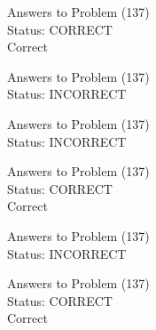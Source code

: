 \documentclass[11pt]{article}
\begin{document}
\begin{minipage}[t]{0.5\textwidth}
  {\centering
  
  Answers to Problem (137)\\
  Status: CORRECT\\
  Correct\\
  }
\end{minipage}
\begin{minipage}[t]{0.5\textwidth}
  {\centering
  
  Answers to Problem (137)\\
  Status: INCORRECT\\
  
  }
\end{minipage}
\begin{minipage}[t]{0.5\textwidth}
  {\centering
  
  Answers to Problem (137)\\
  Status: INCORRECT\\
  
  }
\end{minipage}
\begin{minipage}[t]{0.5\textwidth}
  {\centering
  
  Answers to Problem (137)\\
  Status: CORRECT\\
  Correct\\
  }
\end{minipage}
\begin{minipage}[t]{0.5\textwidth}
  {\centering
  
  Answers to Problem (137)\\
  Status: INCORRECT\\
  
  }
\end{minipage}
\begin{minipage}[t]{0.5\textwidth}
  {\centering
  
  Answers to Problem (137)\\
  Status: CORRECT\\
  Correct\\
  }
\end{minipage}
\end{document}
